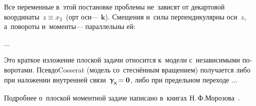 

\label{section:planedeformation.cosseratcontinuum}

\begin{otherlanguage}{russian}

Все переменные в~этой постановке проблемы не~зависят от декартовой координаты~${z \equiv x_3}$~(орт оси\:--- $\bm{k}$).
Смещения и~силы перпендикулярны оси~$z$, а~повороты и~моменты\:--- параллельны ей:

...


Это краткое изложение плоской задачи относится к~модели с~независимыми поворотами.
Псевдо\rucontinuum Cosserat (модель со~стеснённым вращением) получается либо при наложении внутренней связи~${\distortiontensor_{\hspace{-0.25ex}\Xcompanion} \hspace{-0.32ex} = \bm{0}}$, либо при предельном переходе ...

Подробнее о~плоской моментной задаче написано в~книгах Н.\,Ф.\;Морозова~\cite{morozov-twodimensionalproblems, morozov-fractures}.

\end{otherlanguage}



\label{section:nonlinear.micropolar}

